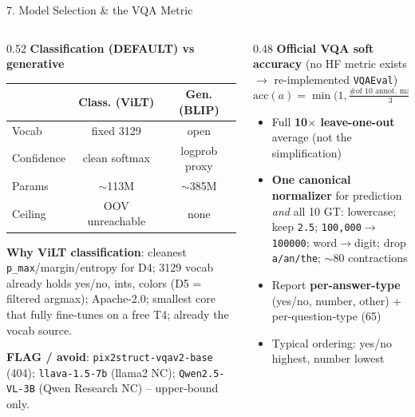 \documentclass[10pt,aspectratio=169]{beamer}
\begin{document}
\begin{frame}{7. Model Selection \& the VQA Metric}
\begin{columns}[T]
\begin{column}{0.52\textwidth}
\textbf{Classification (DEFAULT) vs generative}
\begin{table}[h]
\centering\scriptsize
\begin{tabular}{lcc}
\toprule
 & \textbf{Class. (ViLT)} & \textbf{Gen. (BLIP)} \\
\midrule
Vocab & fixed 3129 & open \\
Confidence & clean softmax & logprob proxy \\
Params & $\sim$113M & $\sim$385M \\
Ceiling & OOV unreachable & none \\
\bottomrule
\end{tabular}
\end{table}
\scriptsize \textbf{Why ViLT classification}: cleanest \texttt{p\_max}/margin/entropy for D4; 3129 vocab already holds yes/no, ints, colors (D5 = filtered argmax); Apache-2.0; smallest core that fully fine-tunes on a free T4; already the vocab source.

\vspace{0.1cm}
\scriptsize \textbf{FLAG / avoid}: \texttt{pix2struct-vqav2-base} (404); \texttt{llava-1.5-7b} (llama2 NC); \texttt{Qwen2.5-VL-3B} (Qwen Research NC) -- upper-bound only.
\end{column}
\begin{column}{0.48\textwidth}
\textbf{Official VQA soft accuracy} (no HF metric exists $\rightarrow$ re-implemented \texttt{VQAEval})
\[
\mathrm{acc}(a)=\min\!\Big(1,\tfrac{\#\text{of 10 annot. matching}}{3}\Big)
\]
\begin{itemize}\scriptsize
  \item Full \textbf{10$\times$ leave-one-out} average (not the simplification)
  \item \textbf{One canonical normalizer} for prediction \emph{and} all 10 GT: lowercase; keep \texttt{2.5}; \texttt{100,000}$\to$\texttt{100000}; word$\to$digit; drop \texttt{a/an/the}; $\sim$80 contractions
  \item Report \textbf{per-answer-type} (yes/no, number, other) + per-question-type (65)
  \item Typical ordering: yes/no highest, number lowest
\end{itemize}
\end{column}
\end{columns}
\end{frame}
\end{document}
